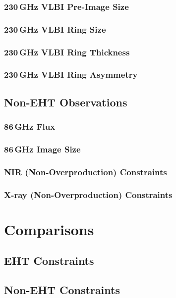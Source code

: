 \documentclass[twocolumn,twocolappendix,tighten,dvipsnames,linenumbers]{aastex63}
\begin{document}
\subsubsection{230\,GHz VLBI Pre-Image Size}
\subsubsection{230\,GHz VLBI Ring Size}
\subsubsection{230\,GHz VLBI Ring Thickness}
\subsubsection{230\,GHz VLBI Ring Asymmetry}

\subsection{Non-EHT Observations}
\subsubsection{86\,GHz Flux}
\subsubsection{86\,GHz Image Size}
\subsubsection{NIR (Non-Overproduction) Constraints}
\subsubsection{X-ray (Non-Overproduction) Constraints}

\clearpage

\section{Comparisons}

\subsection{EHT Constraints}

\subsection{Non-EHT Constraints}
\end{document}
